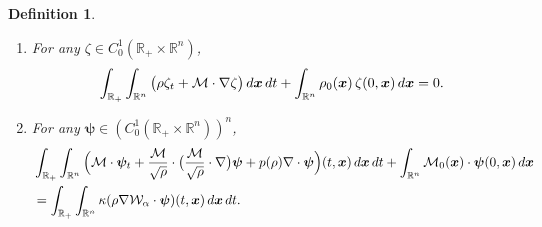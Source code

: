 \documentclass[10pt,a4paper]{amsart}
\newtheorem{definition}{Definition}
\def\M{{\mathcal{M}}}
\def\dd{{\, \rm d}}
\begin{document}
\begin{definition}
\begin{enumerate}
\smallskip
\begin{itemize}
 \item For $\kappa = -1$,
\begin{equation*}
 \int_{\mathbb{R}^n} \Big( \frac{1}{2} \Big| \frac{\M}{\sqrt{\rho}}\Big|^2
 + \rho e(\rho) - \frac{1}{2} \rho (\Phi_\alpha * \rho) \Big)(t,\boldsymbol{x})
 \dd \boldsymbol{x} \leq E_0.
\end{equation*}
\item For $\kappa = 1$,
\begin{align*}
\begin{cases}
\displaystyle
\int_{\mathbb{R}^n} \Big( \frac{1}{2} \Big| \frac{\M}{\sqrt{\rho}}\Big|^2
+ \rho e(\rho) - \frac{1}{2} \rho (\Phi_\alpha * \rho) \Big)(t,\boldsymbol{x})
\dd \boldsymbol{x} \leq C(E_0,M), \\[4mm]
\displaystyle
\int_{\mathbb{R}^n} \Big( \frac{1}{2}\Big|\frac{\M}{\sqrt{\rho}}\Big|^2
+ \rho e(\rho) + \frac{1}{2} \rho (\Phi_\alpha * \rho) \Big)(t,\boldsymbol{x})
\dd \boldsymbol{x} \leq E_0.
\end{cases}
\end{align*}
\end{itemize}
\item[(c)] For any $\zeta \in C^1_0(\mathbb{R}_+ \times \mathbb{R}^n)$,
\begin{equation*}
\int_{\mathbb{R}_+} \int_{\mathbb{R}^n} \big(\rho \zeta_t
+ \M \cdot \nabla \zeta\big) \dd \boldsymbol{x} \dd t
+ \int_{\mathbb{R}^n} \rho_0(\boldsymbol{x})\,\zeta(0,\boldsymbol{x}) \dd \boldsymbol{x} = 0.
\end{equation*}
\item[(d)] For any $\boldsymbol{\psi} \in (C^1_0(\mathbb{R}_+ \times \mathbb{R}^n))^n$,
    \begin{align*}
 & \int_{\mathbb{R}_+} \int_{\mathbb{R}^n}
  \Big(\M \cdot \boldsymbol{\psi}_t
 + \frac{\M}{\sqrt{\rho}} \cdot \big( \frac{\M}{\sqrt{\rho}} \cdot \nabla \big)
 \boldsymbol{\psi} + p(\rho)\nabla \cdot \boldsymbol{\psi} \Big)(t,\boldsymbol{x})
 \dd \boldsymbol{x} \dd t
  + \int_{\mathbb{R}^n} \M_0(\boldsymbol{x}) \cdot \boldsymbol{\psi}(0,\boldsymbol{x}) \dd \boldsymbol{x} \\
  & = \int_{\mathbb{R}_+} \int_{\mathbb{R}^n} \kappa(\rho \nabla \mathcal{W}_\alpha \cdot \boldsymbol{\psi})(t,\boldsymbol{x}) \dd \boldsymbol{x} \dd t.
    \end{align*}
\end{enumerate}
\end{definition}
\end{document}

